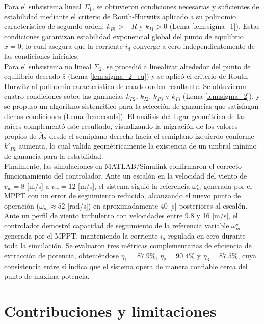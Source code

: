 Para el subsistema lineal $\Sigma_1$, se obtuvieron condiciones necesarias y 
suficientes de estabilidad mediante el criterio de Routh-Hurwitz aplicado a su 
polinomio característico de segundo orden: $k_{P1} > -R$ y $k_{I1} > 0$ 
(Lema \ref{lem:sigma_1}). Estas condiciones garantizan estabilidad exponencial global del 
punto de equilibrio $\bar{x} = 0$, lo cual asegura que la corriente $i_d$ 
converge a cero independientemente de las condiciones iniciales.
\\

Para el subsistema no lineal $\Sigma_2$, se procedió a linealizar alrededor del 
punto de equilibrio deseado $\bar{z}$ (Lema \ref{lem:sigma_2_eq}) y se aplicó el criterio de 
Routh-Hurwitz al polinomio característico de cuarto orden resultante. Se 
obtuvieron cuatro condiciones sobre las ganancias $k_{P2}$, $k_{I2}$, $k_{P3}$ 
y $k_{I3}$ (Lema \ref{lem:sigma_2}), y se propuso un algoritmo sistemático para la 
selección de ganancias que satisfagan dichas condiciones (Lema \ref{lem:conds}). El 
análisis del lugar geométrico de las raíces complementó este resultado, 
visualizando la migración de los valores propios de $\bar{A}_2$ desde el 
semiplano derecho hacia el semiplano izquierdo conforme $k'_{P2}$ aumenta, lo 
cual valida geométricamente la existencia de un umbral mínimo de ganancia para 
la estabilidad.
\\

Finalmente, las simulaciones en MATLAB/Simulink confirmaron el correcto 
funcionamiento del controlador. Ante un escalón en la velocidad del viento de
$v_w = 8$ [m/s] a $v_w = 12$ [m/s], el sistema siguió la referencia 
$\omega_m^\star$ generada por el MPPT con un error de seguimiento reducido, 
alcanzando el nuevo punto de operación ($\omega_m \approx 52$ [rad/s]) en 
aproximadamente 40 [s] posteriores al escalón. Ante un 
perfil de viento turbulento con velocidades entre 9.8 y 16 [m/s], el controlador 
demostró capacidad de seguimiento de la referencia variable $\omega_m^\star$ 
generada por el MPPT, manteniendo la corriente $i_d$ regulada en cero durante 
toda la simulación. Se evaluaron tres métricas complementarias de eficiencia de 
extracción de potencia, obteniéndose $\eta_1 = 87.9\%$, $\eta_2 = 90.4\%$ y 
$\eta_3 = 87.5\%$, cuya consistencia entre sí indica que el sistema opera de 
manera confiable cerca del punto de máxima potencia.

\section{Contribuciones y limitaciones}

